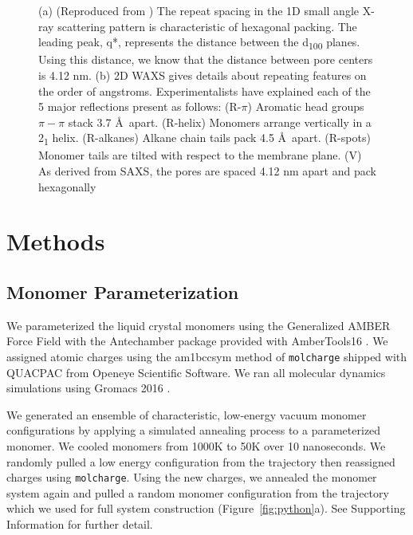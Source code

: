 \documentclass[journal=jpcbfk,manusciprt=article]{achemso}
\begin{document}
\begin{figure}
\begin{subfigure}[t]{0.47\linewidth}
                \caption{}\label{fig:WAXS}
        \end{subfigure}
	\caption{(a) (Reproduced from \cite{feng_thin_2016}) The repeat spacing
		in the 1D small angle X-ray scattering pattern is characteristic of hexagonal
		packing. The leading peak, q*, represents the distance between the
		d\textsubscript{100} planes. Using this distance, we know that the distance
		between pore centers is 4.12 nm. (b) 2D WAXS gives
		details about repeating features on the order of angstroms. Experimentalists
		have explained each of the 5 major reflections present as follows: (R-$\pi$) Aromatic
		head groups $\pi-\pi$ stack 3.7 \AA~apart. (R-helix) Monomers arrange vertically in
		a 2\textsubscript{1} helix. (R-alkanes) Alkane chain tails pack 4.5 \AA~apart. (R-spots)
		Monomer tails are tilted with respect to the membrane plane. (V) As derived from
		SAXS, the pores are spaced 4.12 nm apart and pack hexagonally}
	\label{fig:SWAXS}
 \end{figure}

  \section{Methods}
 
  \subsection{Monomer Parameterization}

  We parameterized the liquid crystal monomers using the Generalized AMBER
  Force Field \cite{wang_development_2004} with the Antechamber package
  \cite{wang_automatic_2006} provided with AmberTools16
  \cite{case_ambertools16_2016}. We assigned atomic charges using the am1bccsym
  method of \texttt{molcharge} shipped with QUACPAC from Openeye Scientific
  Software. We ran all molecular dynamics simulations using Gromacs 2016
  \cite{bekker_gromacs:_1993,berendsen_gromacs:_1995,van_der_spoel_gromacs:_2005,hess_gromacs_2008}.

  We generated an ensemble of characteristic, low-energy vacuum monomer
  configurations by applying a simulated annealing process to a
  parameterized monomer. We cooled monomers from 1000K to 50K over 10
  nanoseconds. We randomly pulled a low energy configuration from the
  trajectory then reassigned charges using \texttt{molcharge}. Using the new
  charges, we annealed the monomer system again and pulled a random monomer
  configuration from the trajectory which we used for full system
  construction (Figure~\ref{fig:python}a). See Supporting Information for
  further detail.
\end{document}
